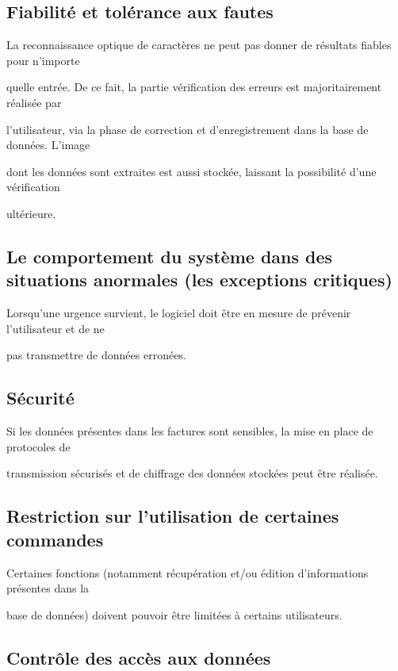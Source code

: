 \documentclass[a4paper,10pt]{article}
\begin{document}
\subsection{Fiabilité et tolérance aux fautes}

La reconnaissance optique de caractères ne peut pas donner de résultats fiables pour n’importe 

quelle entrée. De ce fait, la partie vérification des erreurs est majoritairement réalisée par 

l’utilisateur, via la phase de correction et d’enregistrement dans la base de données. L’image 

dont les données sont extraites est aussi stockée, laissant la possibilité d’une vérification 

ultérieure.

\subsection{Le comportement du système dans des situations anormales (les exceptions critiques)}

Lorsqu’une urgence survient, le logiciel doit être en mesure de prévenir l’utilisateur et de ne 

pas transmettre de données erronées. 

\subsection{Sécurité}

Si les données présentes dans les factures sont sensibles, la mise en place de protocoles de 

transmission sécurisés et de chiffrage des données stockées peut être réalisée.

\subsection{Restriction sur l'utilisation de certaines commandes}

Certaines fonctions (notamment récupération et/ou édition d’informations présentes dans la 

base de données) doivent pouvoir être limitées à certains utilisateurs.

\subsection{Contrôle des accès aux données}
\end{document}
